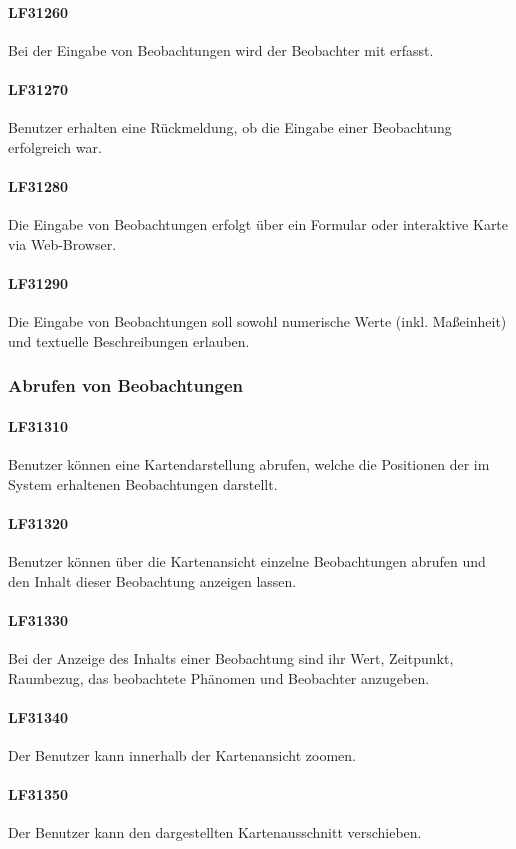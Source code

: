 \documentclass[a4paper,11pt]{scrartcl}
\begin{document}
			\paragraph{LF31260}
				Bei der Eingabe von Beobachtungen wird der Beobachter mit erfasst.
			\paragraph{LF31270}
				Benutzer erhalten eine Rückmeldung, ob die Eingabe einer Beobachtung erfolgreich war.
			\paragraph{LF31280}
				Die Eingabe von Beobachtungen erfolgt über ein Formular oder interaktive Karte via Web-Browser.
			\paragraph{LF31290}
				Die Eingabe von Beobachtungen soll sowohl numerische Werte (inkl. Maßeinheit) und textuelle Beschreibungen erlauben.
		\subsubsection{Abrufen von Beobachtungen}
			\paragraph{LF31310}
				Benutzer können eine Kartendarstellung abrufen, welche die Positionen der im System erhaltenen Beobachtungen darstellt.
			\paragraph{LF31320}
				Benutzer können über die Kartenansicht einzelne Beobachtungen abrufen und den Inhalt dieser Beobachtung anzeigen lassen.
			\paragraph{LF31330}
				Bei der Anzeige des Inhalts einer Beobachtung sind ihr Wert, Zeitpunkt, Raumbezug, das beobachtete Phänomen und Beobachter anzugeben.
			\paragraph{LF31340}
				Der Benutzer kann innerhalb der Kartenansicht zoomen.
			\paragraph{LF31350}
				Der Benutzer kann den dargestellten Kartenausschnitt verschieben.
\end{document}
